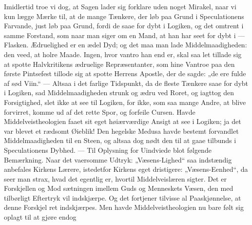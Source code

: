 \documentclass[12pt,a4paper]{book}
\begin{document}
Imidlertid troe vi dog, at Sagen lader sig forklare uden noget Mirakel, naar vi kun
lægge Mærke til, at de mange Tænkere, der løb paa Grund i Speculationens Farvande,
just løb paa Grund, fordi de saae for dybt i Logiken, og det omtrent i samme Forstand,
som naar man siger om en Mand, at han har seet for dybt i --- Flasken. Ædruelighed er
en ædel Dyd; og det maa man lade Middelmaadigheden: den veed, at holre Maade. Ingen,
hvor vantro han end er, skal saa let tillade sig at spotte Halvkritikens ædruelige
Repræsentanter, som hine Vantroe paa den første Pintsefest tillode sig at spotte
Herrens Apostle, der de sagde: „de ere fulde af sød Viin.“ --- Altsaa i det farlige
Tidspunkt, da de fleste Tænkere saae for dybt i Logiken, sad Middelmaadigheden strunk
og ædru ved Roret, og iagttog den Forsigtighed, slet ikke at see til Logiken, for
ikke, som saa mange Andre, at blive forvirret, komme ud af det rette Spor, og forfeile
Cursen. Havde Middelveistheologien faaet sit eget høiærværdige Ansigt at see i
Logiken; ja det var blevet et rædsomt Øieblik! Den hegelske Medusa havde bestemt
forvandlet Middelmaadigheden til en Steen, og altsaa dog nødt den til at gaae tilbunds
i Speculationens Dybhed. --- Til Oplysning for Uindviede blot følgende Bemærkning.
Naar det vaersomme Udtryk: „Væsens-Lighed“ saa indstændig anbefales Kirkens Lærere,
istedetfor Kirkens eget dristigere: „Væsens-Eenhed“, da seer man strax, hvad det
egentlig er, hvortil Middelveislæren sigter. Det er Forskjellen og Mod\-%
sætningen imellem Guds og Menneskets Væsen, den med tilbørligt Eftertryk vil
indskjærpe. Og det fortjener tilvisse al Paaskjønnelse, at denne Forskjel ret
indskjærpes. Men havde Middelveistheologien nu bare følt sig oplagt til at gjøre endog
\end{document}

